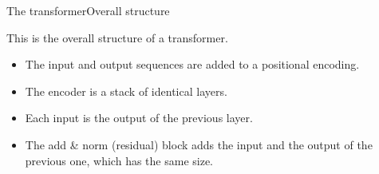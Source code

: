 \documentclass{beamer}
\begin{document}
\begin{frame}{The transformer}{Overall structure}
\begin{multicols}{2}
This is the overall structure of a transformer. 
\begin{itemize}
    \item The input and output sequences are added to a positional encoding.
    \item The encoder is a stack of identical layers.
    \item Each input is the output of the previous layer. 
    \item The add \& norm (residual) block adds the input and the output of the previous one, which has the same size.  
    \end{itemize}

\end{multicols}
\end{frame}
\end{document}
